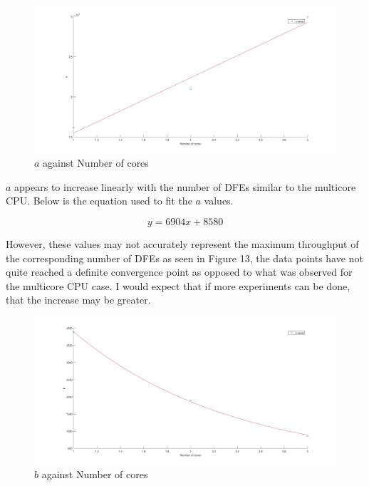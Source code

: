 \documentclass[a4paper,11pt]{article}
\begin{document}
\begin{figure}[H]
	\hspace{-2.8cm}
	\includegraphics[scale=0.3]{images/dfe_a}
	\caption{$a$ against Number of cores}
\end{figure}

\noindent $a$ appears to increase linearly with the number of DFEs similar to the multicore CPU. Below is the equation used to fit the $a$ values.

\begin{equation}
y=6904x + 8580
\end{equation}

\noindent However, these values may not accurately represent the maximum throughput of the corresponding number of DFEs as seen in Figure 13, the data points have not quite reached a definite convergence point as opposed to what was observed for the multicore CPU case. I would expect that if more experiments can be done, that the increase may be greater.

\begin{figure}[H]
	\hspace{-2.8cm}
	\includegraphics[scale=0.3]{images/dfe_b}
	\caption{$b$ against Number of cores}
\end{figure}
\end{document}
